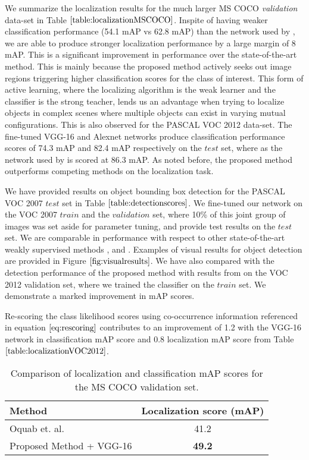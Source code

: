 \documentclass[runningheads]{llncs}
\begin{document}
We summarize the localization results for the much larger MS COCO \textit{validation} data-set in Table $\ref{table:localizationMSCOCO}$. Inspite of having weaker classification performance (54.1 mAP vs 62.8 mAP) than the network used by \cite{oquabobject}, we are able to produce stronger localization performance by a large margin of 8 mAP. This is a significant improvement in performance over the state-of-the-art method. This is mainly because the proposed method actively seeks out image regions triggering higher classification scores for the class of interest. This form of active learning, where the localizing algorithm is the weak learner and the classifier is the strong teacher, lends us an advantage when trying to localize objects in complex scenes where multiple objects can exist in varying mutual configurations. This is also observed for the PASCAL VOC 2012 data-set. The fine-tuned VGG-16 and Alexnet networks produce classification performance scores of  74.3 mAP and 82.4 mAP respectively on the $\textit{test}$ set, where as the network used by \cite{oquabobject} is scored at 86.3 mAP. As noted before, the proposed method outperforms competing methods on the localization task.

We have provided results on object bounding box detection for the PASCAL VOC 2007 $\textit{test}$ set in Table $\ref{table:detectionscores}$. We fine-tuned our network on the VOC 2007 $\textit{train}$ and the $\textit{validation}$ set, where 10\% of this joint group of images was set aside for parameter tuning, and provide test results on the $\textit{test}$ set. We are comparable in performance with respect to other state-of-the-art weakly supervised methods \cite{cinbis2014multi}, \cite{bilen2015weakly} and \cite{wang2014weakly}.  Examples of visual results for object detection are provided in Figure $\ref{fig:visualresults}$. We have also compared with the detection performance of the proposed method with results from \cite{oquabobject} on the VOC 2012 validation set, where we trained the classifier on the $\textit{train}$ set. We demonstrate a marked improvement in mAP scores.



Re-scoring the class likelihood scores using co-occurrence information referenced in equation $\ref{eq:rescoring}$ contributes to an improvement of 1.2 with the VGG-16 network in classification mAP score and 0.8 localization mAP score from Table $\ref{table:localizationVOC2012}$.


\begin{table}[]
\small
\centering
\begin{tabular}{|l|c|}
\hline
\textbf{Method} & \multicolumn{1}{l|}{Localization score (mAP)} \\ \hline
Oquab et. al. \cite{oquabobject} & 41.2 \\ \hline
Proposed Method + VGG-16 & \textbf{49.2} \\ \hline
\end{tabular}
\caption{Comparison of localization and classification mAP scores for the MS COCO validation set.}
\label{table:localizationMSCOCO}
\end{table}
\end{document}
